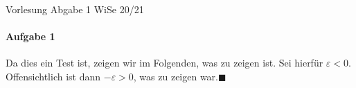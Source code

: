 \documentclass[a4paper]{article}
\begin{document}
\renewcommand{\rmdefault}{\sfdefault}
\newcommand{\quoderat}{\hfill$\blacksquare$}
\setlength{\parindent}{0pt}
\pagestyle{fancy}
\lhead
  {
  Vorlesung}
\chead
  {
  \Large Abgabe 1}
\rhead
  {
  WiSe 20/21}
\paragraph{Aufgabe 1} Da dies ein Test ist, zeigen wir im Folgenden, was zu zeigen ist. Sei hierfür $\varepsilon < 0$.
Offensichtlich ist dann $-\varepsilon > 0$, was zu zeigen war.\quoderat
\cfoot
  {
  \hphantom{X}}
\rfoot
  {\thepage}
\end{document}
